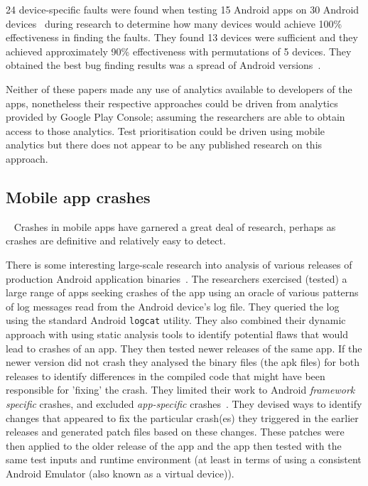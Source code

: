 24 device-specific faults were found when testing 15 Android apps on 30 Android devices~ during research to determine how many devices would achieve 100\% effectiveness in finding the faults. They found 13 devices were sufficient and they achieved approximately 90\% effectiveness with permutations of 5 devices. They obtained the best bug finding results was a spread of Android versions~. 

Neither of these papers made any use of analytics available to developers of the apps, nonetheless their respective approaches could be driven from analytics provided by Google Play Console; assuming the researchers are able to obtain access to those analytics. Test prioritisation could be driven using mobile analytics but there does not appear to be any published research on this approach.


\subsection{Mobile app crashes}~\label{rw-mobile-app-crashes-topic}
Crashes in mobile apps have garnered a great deal of research, perhaps as crashes are definitive and relatively easy to detect.

There is some interesting large-scale research into analysis of various releases of production Android application binaries~. The researchers exercised (tested) a large range of apps seeking crashes of the app using an oracle of various patterns of log messages read from the Android device's log file. They queried the log using the standard Android \texttt{logcat} utility. They also combined their dynamic approach with using static analysis tools to identify potential flaws that would lead to crashes of an app. They then tested newer releases of the same app. If the newer version did not crash they analysed the binary files (the \Gls{apk} 
files) for both releases to identify differences in the compiled code that might have been responsible for 'fixing' the crash. They limited their work to Android \emph{framework specific} crashes, and excluded \emph{app-specific} crashes~. They devised ways to identify changes that appeared to fix the particular crash(es) they triggered in the earlier releases and generated patch files based on these changes. These patches were then applied to the older release of the app and the app then tested with the same test inputs and runtime environment (at least in terms of using a consistent Android Emulator (also known as a virtual device)). 

